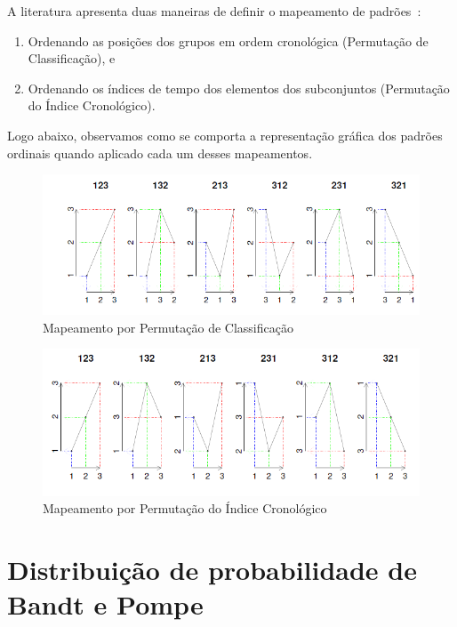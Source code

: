 A literatura apresenta duas maneiras de definir o mapeamento de padrões~\citep{tiedvalues}:  

\begin{enumerate}[label=(\alph*)]
\item Ordenando as posições dos grupos em ordem cronológica (Permutação de Classificação), e 
\item Ordenando os índices de tempo dos elementos dos subconjuntos (Permutação do Índice Cronológico).
\end{enumerate}

Logo abaixo, observamos como se comporta a representação gráfica dos padrões ordinais quando aplicado cada um desses mapeamentos.

\begin{figure}[!ht]
	\begin{center}
		\includegraphics[width=0.7\columnwidth]{capitulos/imagens/rankPermutation.png}
        \caption{Mapeamento por Permutação de Classificação~\citep{tiedvalues}}
	\end{center}
\end{figure}

\begin{figure}[!ht]
	\begin{center}
		\includegraphics[width=0.7\columnwidth]{capitulos/imagens/chronologicalIndex.png}
        \caption{Mapeamento por Permutação do Índice Cronológico~\citep{tiedvalues}}
	\end{center}
\end{figure}
				

\section{Distribuição de probabilidade de Bandt e Pompe}

